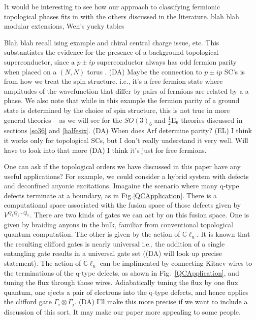 \documentclass[12pt,a4paper]{article}
\newcommand{\tp}{\otimes}
\newcommand{\cl}{\mathbb{C}\ell}
\newcommand{\dave}[1]{{\color{ao(english)}\footnotesize{(DA) #1}}}
\newcommand{\ethan}[1]{{\color{amethyst}\footnotesize{(EL) #1}}}
\newcommand{\halfesix}{\frac{1}{2}\text{E}_6}
\begin{document}
It would be interesting to see how our approach to classifying fermionic topological phases fits in 
with the others discussed in the literature. 
blah blah modular extensions, Wen's yucky tables

Blah blah recall ising example and chiral central charge issue, etc. 
This substantiates the evidence for the presence of a background topological superconductor, 
since a $p\pm ip$ superconductor always has odd fermion parity when placed 
on a $(N,N)$ torus \cite{ware2016,you2015}.
\dave{Maybe the connection to $p\pm ip$ SC's is from how we treat the spin structure. 
i.e., it's a free fermion state where amplitudes of the wavefunction that differ by pairs of 
fermions are related by a a phase. 
}
We also note that while in this example the fermion parity of a ground state is determined by 
the choice of spin structure, this is not true in more general theories -- as we will see 
for the $SO(3)_6$ and $\halfesix$ theories discussed in sections \ref{so36} and \ref{halfesix}.
\dave{When does Arf determine parity?}
\ethan{I think it works only for topological SCs, but I don't really understand it very well. Will have to look into that more}
\dave{I think it's just for free fermions.}

One can ask if the topological orders we have discussed in this paper have any useful applications?
For example, we could consider a hybrid system with defects and deconfined anyonic excitations.
Imagaine the scenario where many q-type defects terminate at a boundary, as in Fig.\ref{QCApplication}. 
There is a computational space associated with the fusion space of those defects given by $V^{Q_1 Q_2 \cdots Q_n}$. 
There are two kinds of gates we can act by on this fusion space.
One is given by braiding anyons in the bulk, familiar from conventional topological quantum computation.
The other is given by the action of $\cl_n$.
It is known that the resulting clifford gates is nearly universal i.e., the addition of a single entangling gate results in a universal gate set (\dave{will look up precise statement}).
The action of $\cl_n$ can be implimented by connecting Kitaev wires to the terminations of the q-type defects, as shown in Fig.~\ref{QCApplication}, and tuning the flux through those wires. 
Adiabatically tuning the flux by one flux quantum, one ejects a pair of electrons into the q-type defects, and hence applies the clifford gate $\Gamma_i \tp \Gamma_j$.
\dave{I'll make this more precise if we want to include a discussion of this sort.
It may make our paper more appealing to some people.}
\end{document}
